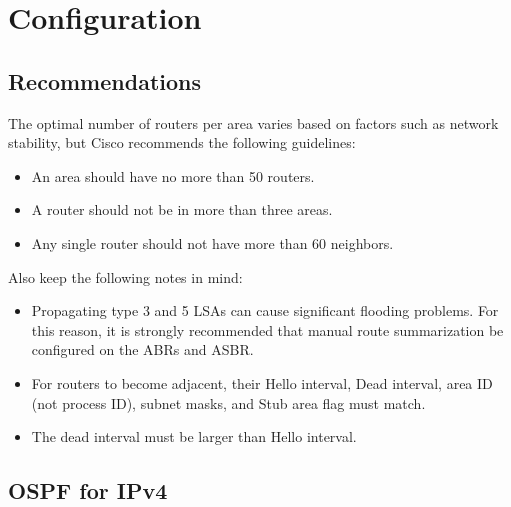 \section{Configuration}

\subsection{Recommendations}

The optimal number of routers per area varies based on factors such as network stability, but Cisco recommends the following guidelines:
\begin{itemize}
\item An area should have no more than 50 routers.
\item A router should not be in more than three areas.
\item Any single router should not have more than 60 neighbors.
\end{itemize}

Also keep the following notes in mind:
\begin{itemize}
\item Propagating type 3 and 5 LSAs can cause significant flooding problems. For this reason, it is strongly recommended that manual route summarization be configured on the ABRs and ASBR.
\item For routers to become adjacent, their Hello interval, Dead interval, area ID (not process ID), subnet masks, and Stub area flag must match.
\item  The dead interval must be larger than Hello interval.
\end{itemize}

\subsection{OSPF for IPv4}

